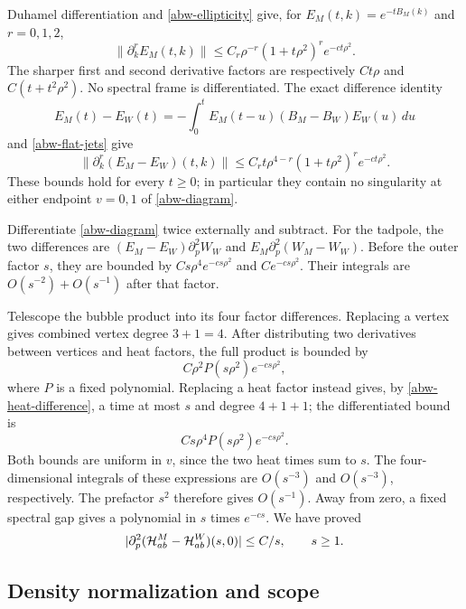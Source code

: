\documentclass[11pt]{article}
\theoremstyle{remark}
\begin{document}
Duhamel differentiation and \eqref{abw-ellipticity} give, for
\(E_M(t,k)=e^{-tB_M(k)}\) and \(r=0,1,2\),
\begin{equation}
 \|\partial_k^rE_M(t,k)\|
 \le C_r\rho^{-r}(1+t\rho^2)^r e^{-ct\rho^2}.
 \label{abw-heat}
\end{equation}
The sharper first and second derivative factors are respectively
\(Ct\rho\) and \(C(t+t^2\rho^2)\). No spectral frame is differentiated.
The exact difference identity
\[
 E_M(t)-E_W(t)
 =-\int_0^t E_M(t-u)(B_M-B_W)E_W(u)\,du
\]
and \eqref{abw-flat-jets} give
\begin{equation}
 \|\partial_k^r(E_M-E_W)(t,k)\|
 \le C_r t\rho^{4-r}(1+t\rho^2)^r e^{-ct\rho^2}.
 \label{abw-heat-difference}
\end{equation}
These bounds hold for every \(t\ge0\); in particular they contain no
singularity at either endpoint \(v=0,1\) of \eqref{abw-diagram}.

Differentiate \eqref{abw-diagram} twice externally and subtract.
For the tadpole, the two differences are
\((E_M-E_W)\partial_p^2W_W\) and
\(E_M\partial_p^2(W_M-W_W)\).
Before the outer factor \(s\), they are bounded by
\(Cs\rho^4e^{-cs\rho^2}\) and \(Ce^{-cs\rho^2}\).
Their integrals are \(O(s^{-2})+O(s^{-1})\) after that factor.

Telescope the bubble product into its four factor differences.
Replacing a vertex gives combined vertex degree \(3+1=4\).
After distributing two derivatives between vertices and heat factors,
the full product is bounded by
\[
 C\rho^2 P(s\rho^2)e^{-cs\rho^2},
\]
where \(P\) is a fixed polynomial. Replacing a heat factor instead
gives, by \eqref{abw-heat-difference}, a time at most \(s\) and degree
\(4+1+1\); the differentiated bound is
\[
 Cs\rho^4 P(s\rho^2)e^{-cs\rho^2}.
\]
Both bounds are uniform in \(v\), since the two heat times sum to \(s\).
The four-dimensional integrals of these expressions are
\(O(s^{-3})\) and \(O(s^{-3})\), respectively.
The prefactor \(s^2\) therefore gives \(O(s^{-1})\).
Away from zero, a fixed spectral gap gives a polynomial in \(s\)
times \(e^{-cs}\). We have proved
\begin{equation}
 |\partial_p^2({\cal H}_{ab}^M-{\cal H}_{ab}^W)(s,0)|
 \le C/s,\qquad s\ge1.
 \label{abw-two-point-bound}
\end{equation}

\subsection{Density normalization and scope}
\label{abw-density-section}
\end{document}
